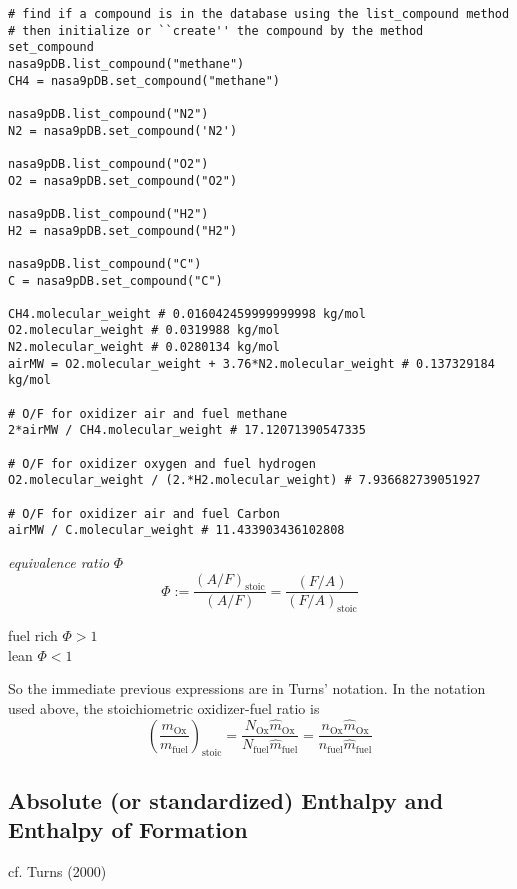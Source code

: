 \documentclass[10pt]{amsart}
\begin{document}
\begin{multicols*}{2}
\begin{lstlisting}
# find if a compound is in the database using the list_compound method
# then initialize or ``create'' the compound by the method set_compound
nasa9pDB.list_compound("methane")
CH4 = nasa9pDB.set_compound("methane")

nasa9pDB.list_compound("N2")
N2 = nasa9pDB.set_compound('N2')

nasa9pDB.list_compound("O2")
O2 = nasa9pDB.set_compound("O2")

nasa9pDB.list_compound("H2")
H2 = nasa9pDB.set_compound("H2")

nasa9pDB.list_compound("C")
C = nasa9pDB.set_compound("C")

CH4.molecular_weight # 0.016042459999999998 kg/mol
O2.molecular_weight # 0.0319988 kg/mol
N2.molecular_weight # 0.0280134 kg/mol
airMW = O2.molecular_weight + 3.76*N2.molecular_weight # 0.137329184 kg/mol

# O/F for oxidizer air and fuel methane
2*airMW / CH4.molecular_weight # 17.12071390547335

# O/F for oxidizer oxygen and fuel hydrogen
O2.molecular_weight / (2.*H2.molecular_weight) # 7.936682739051927

# O/F for oxidizer air and fuel Carbon
airMW / C.molecular_weight # 11.433903436102808
\end{lstlisting}


\emph{equivalence ratio} $\Phi$
\[
\Phi := \frac{ (A/F)_{\text{stoic}} }{ (A/F) } = \frac{(F/A)}{(F/A)_{\text{stoic}} }
\]


fuel rich $\Phi > 1$ \\
\phantom{fuel } lean $\Phi <1$


So the immediate previous expressions are in Turns' notation\cite{STurns2011}.  In the notation used above, the stoichiometric oxidizer-fuel ratio is 
\[
\left( \frac{m_{\text{Ox}}}{m_{\text{fuel}} } \right)_{\text{stoic} }  = \frac{N_{\text{Ox}} \widehat{m}_{\text{Ox}} }{ N_{\text{fuel}} \widehat{m}_{\text{fuel}} } = \frac{ n_{\text{Ox}} \widehat{m}_{\text{Ox}} }{ n_{\text{fuel} } \widehat{m}_{\text{fuel}} }
\]












\subsection{Absolute (or standardized) Enthalpy and Enthalpy of Formation}
cf. Turns (2000) \cite{STurns2011}


\end{multicols*}
\end{document}
